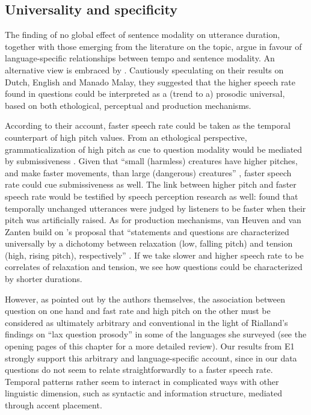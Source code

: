 \subsection{Universality and specificity}\label{sec451}
The finding of no global effect of sentence modality on utterance duration, together with those emerging from the literature on the topic, argue in favour of language-specific relationships between tempo and sentence modality. An alternative view is embraced by \citet{vanheuven2005speech}. Cautiously speculating on their results on Dutch, English and Manado Malay, they suggested that the higher speech rate found in questions could be interpreted as a (trend to a) prosodic universal, based on both ethological, perceptual and production mechanisms. 

According to their account, faster speech rate could be taken as the temporal counterpart of high pitch values. From an ethological perspective, grammaticalization of high pitch as cue to question modality would be mediated by submissiveness \citep{ohala1984ethological,gussenhoven2004phonology}. Given that ``small (harmless) creatures have higher pitches, and make faster movements, than large (dangerous) creatures'' \citep[p. 97]{vanheuven2005speech}, faster speech rate could cue submissiveness as well. The link between higher pitch and faster speech rate would be testified by speech perception research as well: \citet{rietveld1987perceived} found that temporally unchanged utterances were judged by listeners to be faster when their pitch was artificially raised. As for production mechanisms, van Heuven and van Zanten build on \citeauthor{bolinger1964intonation}'s \citeyear{bolinger1964intonation,bolinger1989intonation} proposal that ``statements and questions are characterized universally by a dichotomy between relaxation (low, falling pitch) and tension (high, rising pitch), respectively'' \citep[\textit{ibid.}]{vanheuven2005speech}. If we take slower and higher speech rate to be correlates of relaxation and tension, we see how questions could be characterized by shorter durations. 

However, as pointed out by the authors themselves, the association between question on one hand and fast rate and high pitch on the other must be considered as ultimately arbitrary and conventional in the light of Rialland's findings on ``lax question prosody'' in some of the languages she surveyed (see the opening pages of this chapter for a more detailed review). Our results from E1 strongly support this arbitrary and language-specific account, since in our data questions do not seem to relate straightforwardly to a faster speech rate. Temporal patterns rather seem to interact in complicated ways with other linguistic dimension, such as syntactic and information structure, mediated through accent placement.

